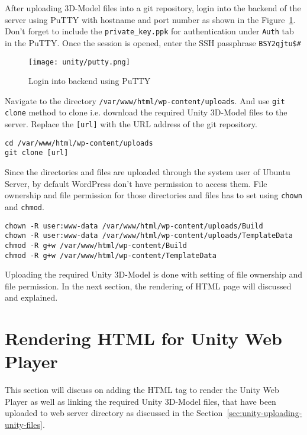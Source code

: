 After uploading 3D-Model files into a git repository, login into the backend of the server using PuTTY with hostname and port number as shown in the Figure~\ref{fig:login-putty}. Don't forget to include the \texttt{private\_key.ppk} for authentication under \texttt{Auth} tab in the PuTTY. Once the session is opened, enter the SSH passphrase \texttt{BSY2qjtu\$\#}

\begin{figure}[ht]
\caption{Login into backend using PuTTY}
\label{fig:login-putty}
\centering
\texttt{[image: unity/putty.png]}
\end{figure}

Navigate to the directory \texttt{/var/www/html/wp-content/uploads}. And use \texttt{git clone} method to clone i.e. download the required Unity 3D-Model files to the server. Replace the \texttt{[url]} with the URL address of the git repository.

\begin{lstlisting}
cd /var/www/html/wp-content/uploads
git clone [url]
\end{lstlisting}

Since the directories and files are uploaded through the system user of Ubuntu Server, by default WordPress don't have permission to access them. File ownership and file permission for those directories and files has to set using \texttt{chown} and \texttt{chmod}.

\begin{lstlisting}
chown -R user:www-data /var/www/html/wp-content/uploads/Build
chown -R user:www-data /var/www/html/wp-content/uploads/TemplateData
chmod -R g+w /var/www/html/wp-content/Build
chmod -R g+w /var/www/html/wp-content/TemplateData
\end{lstlisting}

Uploading the required Unity 3D-Model is done with setting of file ownership and file permission. In the next section, the rendering of HTML page will discussed and explained.

\section{Rendering HTML for Unity Web Player} \label{sec:unity-rendering-html-for-unity}
This section will discuss on adding the HTML tag to render the Unity Web Player as well as linking the required Unity 3D-Model files, that have been uploaded to web server directory as discussed in the Section~\ref{sec:unity-uploading-unity-files}.

